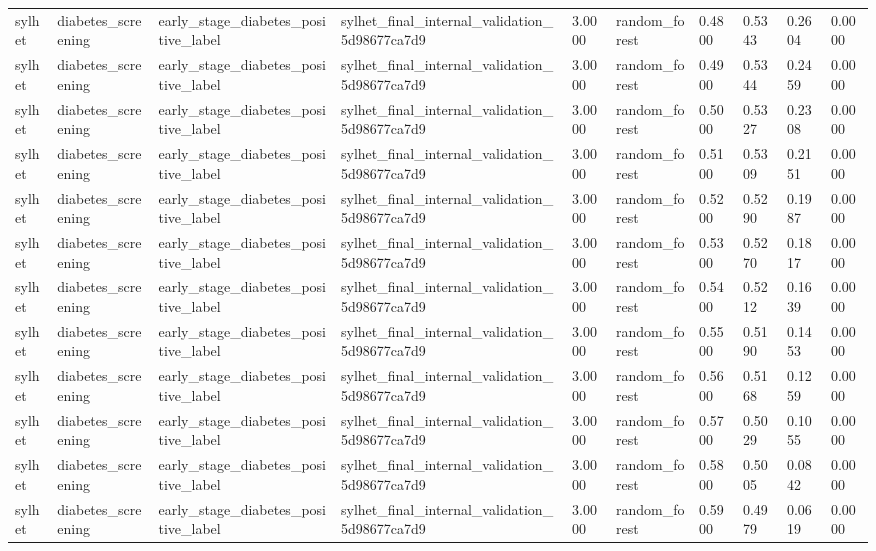 \begin{tabular}{llllllllll}
sylhet & diabetes\_screening & early\_stage\_diabetes\_positive\_label & sylhet\_final\_internal\_validation\_5d98677ca7d9 & 3.0000 & random\_forest & 0.4800 & 0.5343 & 0.2604 & 0.0000 \\
sylhet & diabetes\_screening & early\_stage\_diabetes\_positive\_label & sylhet\_final\_internal\_validation\_5d98677ca7d9 & 3.0000 & random\_forest & 0.4900 & 0.5344 & 0.2459 & 0.0000 \\
sylhet & diabetes\_screening & early\_stage\_diabetes\_positive\_label & sylhet\_final\_internal\_validation\_5d98677ca7d9 & 3.0000 & random\_forest & 0.5000 & 0.5327 & 0.2308 & 0.0000 \\
sylhet & diabetes\_screening & early\_stage\_diabetes\_positive\_label & sylhet\_final\_internal\_validation\_5d98677ca7d9 & 3.0000 & random\_forest & 0.5100 & 0.5309 & 0.2151 & 0.0000 \\
sylhet & diabetes\_screening & early\_stage\_diabetes\_positive\_label & sylhet\_final\_internal\_validation\_5d98677ca7d9 & 3.0000 & random\_forest & 0.5200 & 0.5290 & 0.1987 & 0.0000 \\
sylhet & diabetes\_screening & early\_stage\_diabetes\_positive\_label & sylhet\_final\_internal\_validation\_5d98677ca7d9 & 3.0000 & random\_forest & 0.5300 & 0.5270 & 0.1817 & 0.0000 \\
sylhet & diabetes\_screening & early\_stage\_diabetes\_positive\_label & sylhet\_final\_internal\_validation\_5d98677ca7d9 & 3.0000 & random\_forest & 0.5400 & 0.5212 & 0.1639 & 0.0000 \\
sylhet & diabetes\_screening & early\_stage\_diabetes\_positive\_label & sylhet\_final\_internal\_validation\_5d98677ca7d9 & 3.0000 & random\_forest & 0.5500 & 0.5190 & 0.1453 & 0.0000 \\
sylhet & diabetes\_screening & early\_stage\_diabetes\_positive\_label & sylhet\_final\_internal\_validation\_5d98677ca7d9 & 3.0000 & random\_forest & 0.5600 & 0.5168 & 0.1259 & 0.0000 \\
sylhet & diabetes\_screening & early\_stage\_diabetes\_positive\_label & sylhet\_final\_internal\_validation\_5d98677ca7d9 & 3.0000 & random\_forest & 0.5700 & 0.5029 & 0.1055 & 0.0000 \\
sylhet & diabetes\_screening & early\_stage\_diabetes\_positive\_label & sylhet\_final\_internal\_validation\_5d98677ca7d9 & 3.0000 & random\_forest & 0.5800 & 0.5005 & 0.0842 & 0.0000 \\
sylhet & diabetes\_screening & early\_stage\_diabetes\_positive\_label & sylhet\_final\_internal\_validation\_5d98677ca7d9 & 3.0000 & random\_forest & 0.5900 & 0.4979 & 0.0619 & 0.0000 \\

\end{tabular}
